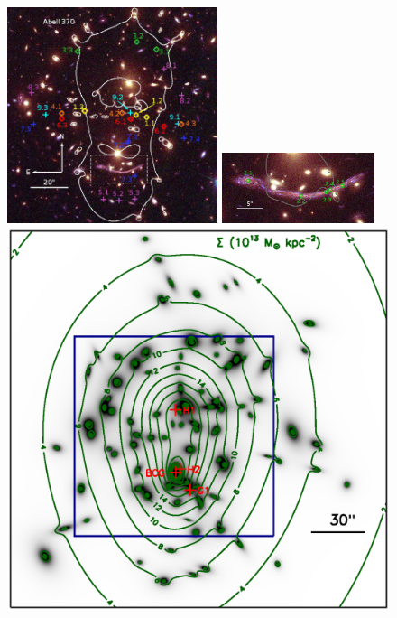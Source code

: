 \begin{figure}[h]
\centering
\includegraphics[width=0.55\textwidth]{Chap2/c2f6a.eps}
\includegraphics[width=0.4\textwidth]{Chap2/c2f6d.eps}
\\
\includegraphics[height=0.28\textheight]{Chap2/c2f6b.eps}

\end{figure}
